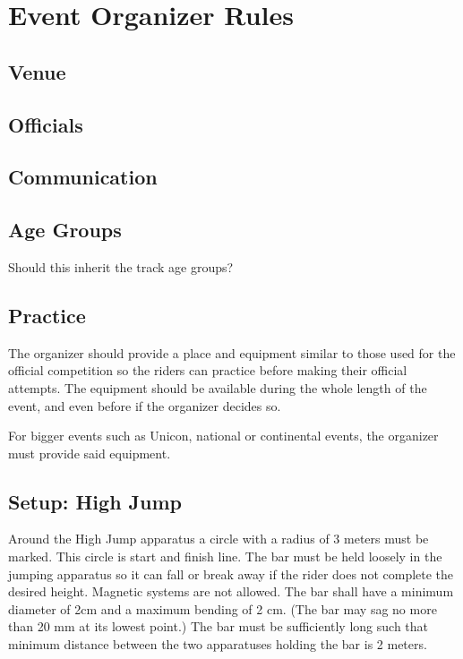 \chapter{Event Organizer Rules}

\section{Venue}

\section{Officials}


\section{Communication}

\section{Age Groups}

\begin{framed}
Should this inherit the track age groups?
\end{framed}

\section{Practice}

The organizer should provide a place and equipment similar to those used for the official competition so the riders can practice before making their official attempts.
The equipment should be available during the whole length of the event, and even before if the organizer decides so.

For bigger events such as Unicon, national or continental events, the organizer must provide said equipment.

\section{Setup: High Jump}
Around the High Jump apparatus a circle with a radius of 3 meters must be marked.
This circle is start and finish line.
The bar must be held loosely in the jumping apparatus so it can fall or break away if the rider does not complete the desired height.
Magnetic systems are not allowed.
The bar shall have a minimum diameter of 2cm and a maximum bending of 2 cm.
(The bar may sag no more than 20 mm at its lowest point.)
The bar must be sufficiently long such that minimum distance between the two apparatuses holding the bar is 2 meters.

